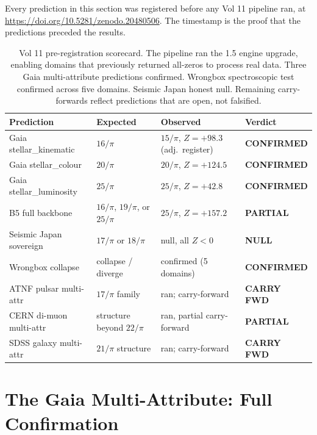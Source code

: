 \documentclass[11pt, letterpaper, openany]{book}
\begin{document}
\begin{empiricalbox}
Every prediction in this section was registered before any Vol 11 pipeline ran,
at \url{https://doi.org/10.5281/zenodo.20480506}. The timestamp is the proof
that the predictions preceded the results.

\begin{table}[H]
\centering
\renewcommand{\arraystretch}{1.4}
\small
\begin{tabular}{|l|l|l|p{4.0cm}|}
\hline
\rowcolor{kishblue!10}
\textbf{Prediction} & \textbf{Expected} & \textbf{Observed} & \textbf{Verdict} \\
\hline\hline
\rowcolor{colourgold!10}
Gaia stellar\_kinematic  & $16/\pi$ & $15/\pi$, $Z=+98.3$ (adj.\ register) & \textbf{CONFIRMED} \\
\rowcolor{colourgold!8}
Gaia stellar\_colour     & $20/\pi$ & $20/\pi$, $Z=+124.5$ & \textbf{CONFIRMED} \\
\rowcolor{colourgold!6}
Gaia stellar\_luminosity & $25/\pi$ & $25/\pi$, $Z=+42.8$  & \textbf{CONFIRMED} \\
\rowcolor{backbonegreen!10}
B5 full backbone  & $16/\pi$, $19/\pi$, or $25/\pi$ & $25/\pi$, $Z=+157.2$ & \textbf{PARTIAL} \\
\rowcolor{gray!8}
Seismic Japan sovereign  & $17/\pi$ or $18/\pi$ & null, all $Z < 0$ & \textbf{NULL} \\
\rowcolor{goldseal!6}
Wrongbox collapse        & collapse / diverge & confirmed (5 domains) & \textbf{CONFIRMED} \\
\rowcolor{gray!6}
ATNF pulsar multi-attr   & $17/\pi$ family & ran; carry-forward & \textbf{CARRY FWD} \\
\rowcolor{gray!6}
CERN di-muon multi-attr  & structure beyond $22/\pi$ & ran, partial carry-forward & \textbf{PARTIAL} \\
\rowcolor{gray!6}
SDSS galaxy multi-attr   & $21/\pi$ structure & ran; carry-forward & \textbf{CARRY FWD} \\
\hline
\end{tabular}
\caption{Vol 11 pre-registration scorecard. The pipeline ran the 1.5 engine
upgrade, enabling domains that previously returned all-zeros to process real data.
Three Gaia multi-attribute predictions confirmed. Wrongbox spectroscopic test
confirmed across five domains. Seismic Japan honest null. Remaining carry-forwards
reflect predictions that are open, not falsified.}
\label{tab:v11_scorecard}
\end{table}

\section{The Gaia Multi-Attribute: Full Confirmation}


\end{empiricalbox}
\end{document}
